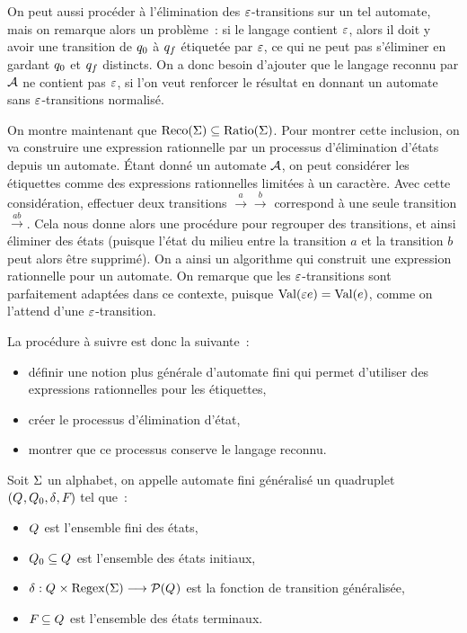 On peut aussi procéder à l'élimination des $\varepsilon$-transitions sur un tel
automate, mais on remarque alors un problème~: si le langage contient $\varepsilon$,
alors il doit y avoir une transition de $q_{0}$ à $q_{f}$ étiquetée par
$\varepsilon$, ce qui ne peut pas s'éliminer en gardant $q_{0}$ et $q_{f}$
distincts. On a donc besoin d'ajouter que le langage reconnu par $\mathcal{A}$ ne
contient pas $\varepsilon$, si l'on veut renforcer le résultat en donnant un automate
sans $\varepsilon$-transitions normalisé.

On montre maintenant que $\operatorname{Reco}(\Sigma)\subseteq \operatorname{Ratio}(\Sigma)$. Pour montrer cette
inclusion, on va construire une expression rationnelle par un processus
d'élimination d'états depuis un automate. \'Etant donné un automate $\mathcal{A}$,
on peut considérer les étiquettes comme des expressions rationnelles limitées à
un caractère. Avec cette considération, effectuer deux transitions
$\xrightarrow a \xrightarrow b$ correspond à une seule transition
$\xrightarrow{ab}$. Cela nous donne alors une procédure pour regrouper des
transitions, et ainsi éliminer des états (puisque l'état du milieu entre la
transition $a$ et la transition $b$ peut alors être supprimé). On a ainsi un
algorithme qui construit une expression rationnelle pour un automate. On
remarque que les $\varepsilon$-transitions sont parfaitement adaptées dans ce contexte,
puisque $\operatorname{Val}(\varepsilon e) = \operatorname{Val}(e)$, comme on l'attend d'une $\varepsilon$-transition.

La procédure à suivre est donc la suivante~:
\begin{itemize}
\item définir une notion plus générale d'automate fini qui permet d'utiliser des
  expressions rationnelles pour les étiquettes,
\item créer le processus d'élimination d'état,
\item montrer que ce processus conserve le langage reconnu.
\end{itemize}

\begin{definition}
  Soit $\Sigma$ un alphabet, on appelle automate fini généralisé un quadruplet
  $(Q_{},Q_{0},\delta_{},F_{})$ tel que~:
  \begin{itemize}
  \item $Q_{}$ est l'ensemble fini des états,
  \item $Q_{0}\subseteq Q_{}$ est l'ensemble des états initiaux,
  \item $\delta_{} : \displaystyle Q_{} \times \operatorname{Regex}(\Sigma) \longrightarrow \mathcal{P}(Q_{})$
    est la fonction de transition généralisée,
  \item $F_{}\subseteq Q_{}$ est l'ensemble des états terminaux.
  \end{itemize}
\end{definition}

